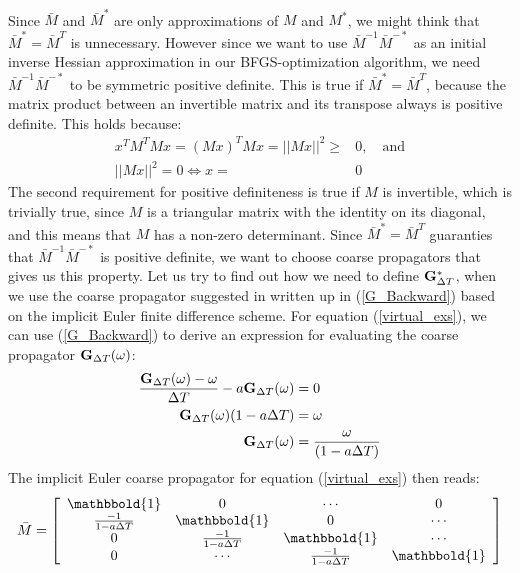 \\
Since $\bar{M}$ and $\bar{M}^{*}$ are only approximations of $M$ and $M^*$, we might think that $\bar{M}^*=\bar{M}^T$ is unnecessary. However since we want to use $\bar{M}^{-1}\bar{M}^{-*}$ as an initial inverse Hessian approximation in our BFGS-optimization algorithm, we need $\bar{M}^{-1}\bar{M}^{-*}$ to be symmetric positive definite. This is true if $\bar{M}^*=\bar{M}^T$, because the matrix product between an invertible matrix and its transpose always is positive definite. This holds because:
\begin{align*}
x^TM^TMx=(Mx)^TMx=||Mx||^2\geq &0, \quad \textrm{and} \\
||Mx||^2=0 \iff x=&0
\end{align*}
The second requirement for positive definiteness is true if $M$ is invertible, which is trivially true, since $M$ is a triangular matrix with the identity on its diagonal, and this means that $M$ has a non-zero determinant. Since $\bar{M}^*=\bar{M}^T$ guaranties that $\bar{M}^{-1}\bar{M}^{-*}$ is positive definite, we want to choose coarse propagators that gives us this property. Let us try to find out how we need to define $\bold G_{\Delta T}^*$, when we use the coarse propagator suggested in \cite{lions2001resolution} written up in (\ref{G_Backward}) based on the implicit Euler finite difference scheme. For equation (\ref{virtual_exs}), we can use (\ref{G_Backward}) to derive an expression for evaluating the coarse propagator $\bold G_{\Delta T}(\omega)$:
\begin{align}
\frac{\bold{G}_{\Delta T}(\omega) -\omega}{\Delta T } - a \bold{G}_{\Delta T}(\omega) &= 0 \\
\bold{G}_{\Delta T}(\omega)(1-a\Delta T)&= \omega \\
\bold{G}_{\Delta T}(\omega)&=\frac{\omega}{(1-a\Delta T)}
\end{align}
The implicit Euler coarse propagator for equation (\ref{virtual_exs}) then reads:
\begin{align*}
\bar M = \left[ \begin{array}{cccc}
   	\mathbbold{1} & 0 & \cdots & 0 \\  
   	\frac{-1}{1-a\Delta T} & \mathbbold{1} & 0 & \cdots \\ 
   	0 &\frac{-1}{1-a\Delta T} & \mathbbold{1}  & \cdots \\
   	0 &\cdots &\frac{-1}{1-a\Delta T} & \mathbbold{1}  \\
  	\end{array}  \right]
\end{align*}
